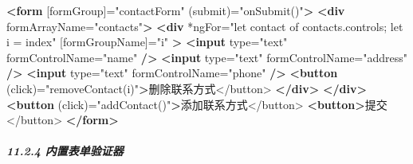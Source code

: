\documentclass[
]{article}
\newenvironment{Shaded}{}{}
\newcommand{\KeywordTok}[1]{\textcolor[rgb]{0.00,0.44,0.13}{\textbf{#1}}}
\newcommand{\NormalTok}[1]{#1}
\newcommand{\OtherTok}[1]{\textcolor[rgb]{0.00,0.44,0.13}{#1}}
\newcommand{\StringTok}[1]{\textcolor[rgb]{0.25,0.44,0.63}{#1}}
\begin{document}
\begin{Shaded}
\begin{Highlighting}[]
\KeywordTok{\textless{}form}\OtherTok{ [formGroup]=}\StringTok{"contactForm"}\OtherTok{ (submit)=}\StringTok{"onSubmit()"}\KeywordTok{\textgreater{}}
  \KeywordTok{\textless{}div}\OtherTok{ formArrayName=}\StringTok{"contacts"}\KeywordTok{\textgreater{}}
    \KeywordTok{\textless{}div}
\OtherTok{      *ngFor=}\StringTok{"let contact of contacts.controls; let i = index"}
\OtherTok{      [formGroupName]=}\StringTok{"i"}
    \KeywordTok{\textgreater{}}
      \KeywordTok{\textless{}input}\OtherTok{ type=}\StringTok{"text"}\OtherTok{ formControlName=}\StringTok{"name"} \KeywordTok{/\textgreater{}}
      \KeywordTok{\textless{}input}\OtherTok{ type=}\StringTok{"text"}\OtherTok{ formControlName=}\StringTok{"address"} \KeywordTok{/\textgreater{}}
      \KeywordTok{\textless{}input}\OtherTok{ type=}\StringTok{"text"}\OtherTok{ formControlName=}\StringTok{"phone"} \KeywordTok{/\textgreater{}}
      \KeywordTok{\textless{}button}\OtherTok{ (click)=}\StringTok{"removeContact(i)"}\KeywordTok{\textgreater{}}\NormalTok{删除联系方式\textless{}/button\textgreater{}}
    \KeywordTok{\textless{}/div\textgreater{}}
  \KeywordTok{\textless{}/div\textgreater{}}
  \KeywordTok{\textless{}button}\OtherTok{ (click)=}\StringTok{"addContact()"}\KeywordTok{\textgreater{}}\NormalTok{添加联系方式\textless{}/button\textgreater{}}
  \KeywordTok{\textless{}button\textgreater{}}\NormalTok{提交\textless{}/button\textgreater{}}
\KeywordTok{\textless{}/form\textgreater{}}
\end{Highlighting}
\end{Shaded}

\hypertarget{1124-ux5185ux7f6eux8868ux5355ux9a8cux8bc1ux5668}{%
\subparagraph{11.2.4
内置表单验证器}\label{1124-ux5185ux7f6eux8868ux5355ux9a8cux8bc1ux5668}}
\end{document}
